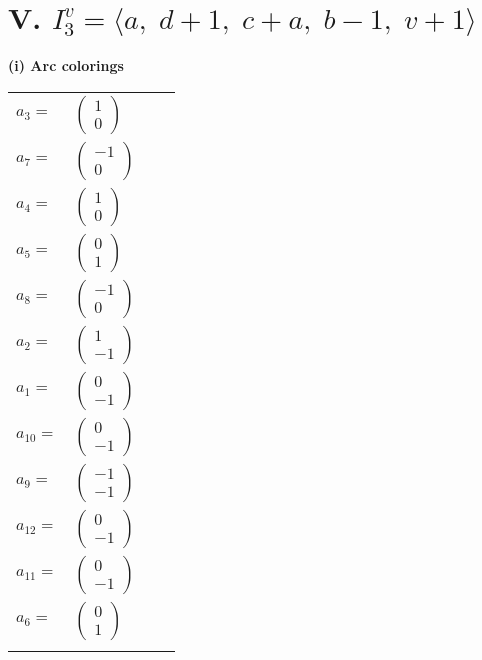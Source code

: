 \documentclass[1p]{elsarticle_modified}
\theoremstyle{definition}
\begin{document}
\centering \section*{V. $I^v_{3}= \langle a,\;d+1,\;c+a,\;b-1,\;v+1 \rangle$}
\flushleft \textbf{(i) Arc colorings}\\
\begin{tabular}{m{7pt} m{180pt} m{7pt} m{180pt} }
\flushright $a_{3}=$&$\begin{pmatrix}1\\0\end{pmatrix}$ \\
\flushright $a_{7}=$&$\begin{pmatrix}-1\\0\end{pmatrix}$ \\
\flushright $a_{4}=$&$\begin{pmatrix}1\\0\end{pmatrix}$ \\
\flushright $a_{5}=$&$\begin{pmatrix}0\\1\end{pmatrix}$ \\
\flushright $a_{8}=$&$\begin{pmatrix}-1\\0\end{pmatrix}$ \\
\flushright $a_{2}=$&$\begin{pmatrix}1\\-1\end{pmatrix}$ \\
\flushright $a_{1}=$&$\begin{pmatrix}0\\-1\end{pmatrix}$ \\
\flushright $a_{10}=$&$\begin{pmatrix}0\\-1\end{pmatrix}$ \\
\flushright $a_{9}=$&$\begin{pmatrix}-1\\-1\end{pmatrix}$ \\
\flushright $a_{12}=$&$\begin{pmatrix}0\\-1\end{pmatrix}$ \\
\flushright $a_{11}=$&$\begin{pmatrix}0\\-1\end{pmatrix}$ \\
\flushright $a_{6}=$&$\begin{pmatrix}0\\1\end{pmatrix}$\\&\end{tabular}
\end{document}
